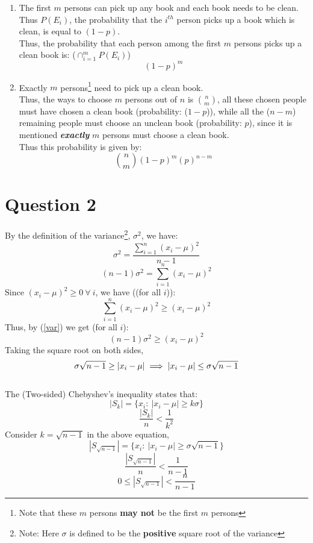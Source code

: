 \documentclass[11pt]{article}
\begin{document}
\begin{enumerate}[label=(\alph*)]
    \item The first $m$ persons can pick up any book and each book needs to be clean. Thus $P(E_i)$, the probability that the $i^{th}$ person picks up a book which is clean, is equal to $(1-p)$.\\
          Thus, the probability that each person among the first $m$ persons picks up a clean book is: ($ \cap_{i=1}^{m} P(E_i) $)
          $$ (1-p)^m $$

    \item Exactly $m$ persons\footnote{Note that these $m$ persons \textbf{may not} be the first $m$ persons} need to pick up a clean book.\\
          Thus, the ways to choose $m$ persons out of $n$ is ${n\choose m}$, all these chosen people must have chosen a clean book (probability: ($1-p$)), while all the ($ n-m $) remaining people must choose an unclean book (probability: $p$), since it is mentioned \textbf{\textit{exactly}} $m$ persons must choose a clean book.\\
          Thus this probability is given by:
          $$ {n\choose m} (1-p)^m (p)^{n-m} $$

\end{enumerate}

\newpage
\section{Question 2}
By the definition of the variance\footnote{Note: Here $\sigma$ is defined to be the \textbf{positive} square root of the variance}, $\sigma^2$, we have:
$$ \sigma^2 = \frac{\sum_{i=1}^n (x_i - \mu)^2}{n-1} $$
\begin{equation}
    \label{var}
    (n-1)\sigma^2 = \sum_{i=1}^n (x_i - \mu)^2
\end{equation}
Since $(x_i - \mu)^2 \ge 0 \  \forall \ i$, we have ((for all $i$)):
$$ \sum_{i=1}^n (x_i - \mu)^2 \ge (x_i - \mu)^2  $$
Thus, by (\ref{var}) we get (for all $i$):
$$ (n-1)\sigma^2 \ge (x_i - \mu)^2 $$
Taking the square root on both sides,
$$ \sigma\sqrt{n-1} \ge |x_i - \mu| \implies |x_i - \mu| \le \sigma\sqrt{n-1} \hfill $$
\hfill \qedsymbol \\
\noindent
The (Two-sided) Chebyshev's inequality states that:
$$ |S_k| = \{ x_i : \  |x_i - \mu| \ge k\sigma \} $$
\begin{equation}
    \frac{|S_k|}{n} < \frac{1}{k^2}
\end{equation}
Consider $k = \sqrt{n-1}$ in the above equation,\\
$$ |S_{\sqrt{n-1}}| = \{ x_i : \  |x_i - \mu| \ge \sigma\sqrt{n-1} \} $$
$$ \frac{|S_{\sqrt{n-1}}|}{n} < \frac{1}{n-1} $$
$$ 0 \leq |S_{\sqrt{n-1}}| < \frac{n}{n-1}$$
\end{document}
